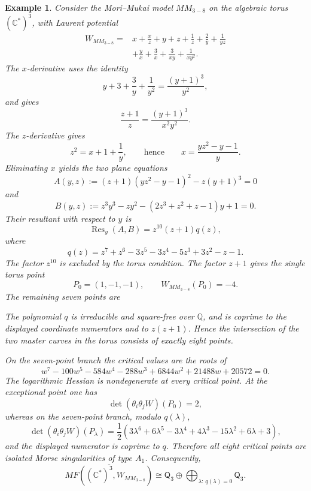 \documentclass[11pt]{amsart}
\newtheorem{example}{Example}[section]
\newcommand{\MorseCat}[1]{\mathsf{Q}_{#1}}
\newcommand{\fitdisplay}[1]{%
  \begin{center}%
  \resizebox{\textwidth}{!}{$\displaystyle #1$}%
  \end{center}%
}
\begin{document}
\begin{example}
Consider the Mori--Mukai model $MM_{3-8}$ on the algebraic torus
$(\mathbb{C}^*)^3$, with Laurent potential
\begin{align*}
W_{MM_{3-8}}={}&x+\frac{x}{z}+y+z+\frac{1}{z}
+\frac{2}{y}+\frac{1}{yz} \\
&+\frac{y}{x}+\frac{3}{x}+\frac{3}{xy}+\frac{1}{xy^2}.
\end{align*}
The $x$-derivative uses the identity
\[
y+3+\frac{3}{y}+\frac{1}{y^2}=\frac{(y+1)^3}{y^2},
\]
and gives
\[
\frac{z+1}{z}=\frac{(y+1)^3}{x^2y^2}.
\]
The $z$-derivative gives
\[
z^2=x+1+\frac{1}{y},
\qquad\text{hence}\qquad
x=\frac{yz^2-y-1}{y}.
\]
Eliminating $x$ yields the two plane equations
\[
A(y,z):=(z+1)(yz^2-y-1)^2-z(y+1)^3=0
\]
and
\[
B(y,z):=z^3y^3-zy^2-(2z^3+z^2+z-1)y+1=0.
\]
Their resultant with respect to $y$ is
\[
\operatorname{Res}_y(A,B)
=z^{10}(z+1)q(z),
\]
where
\[
q(z)=z^7+z^6-3z^5-3z^4-5z^3+3z^2-z-1.
\]
The factor $z^{10}$ is excluded by the torus condition. The factor $z+1$
gives the single torus point
\[
P_0=(1,-1,-1),
\qquad
W_{MM_{3-8}}(P_0)=-4.
\]
The remaining seven points are
\fitdisplay{P_\lambda=\left(
\frac{\lambda^5+\lambda^4-4\lambda^3-\lambda-1}{4},
\frac{\lambda^6+\lambda^5-2\lambda^4-2\lambda^3-7\lambda^2+\lambda-4}{4},
\lambda
\right),
\qquad
q(\lambda)=0}
The polynomial $q$ is irreducible and square-free over $\mathbb{Q}$, and is
coprime to the displayed coordinate numerators and to $z(z+1)$. Hence the
intersection of the two master curves in the torus consists of exactly eight
points.

On the seven-point branch the critical values are the roots of
\[
w^7-100w^5-584w^4-288w^3+6844w^2+21488w+20572=0.
\]
The logarithmic Hessian is nondegenerate at every critical point. At the
exceptional point one has
\[
\det(\theta_i\theta_jW)(P_0)=2,
\]
whereas on the seven-point branch, modulo $q(\lambda)$,
\[
\det(\theta_i\theta_jW)(P_\lambda)
=\frac{1}{2}(3\lambda^6+6\lambda^5-3\lambda^4+4\lambda^3
-15\lambda^2+6\lambda+3),
\]
and the displayed numerator is coprime to $q$. Therefore all eight critical
points are isolated Morse singularities of type $A_1$. Consequently,
\[
\overline{MF((\mathbb{C}^*)^3,W_{MM_{3-8}})}
\cong \MorseCat{3} \oplus \bigoplus_{\lambda:\,q(\lambda)=0}\MorseCat{3}.
\]
\end{example}
\end{document}
